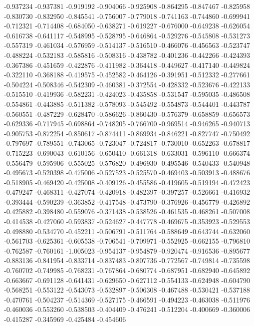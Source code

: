 -0.937234
-0.937381
-0.919192
-0.904066
-0.925908
-0.864295
-0.847467
-0.825958
-0.830730
-0.832950
-0.845541
-0.756007
-0.779018
-0.741163
-0.744860
-0.699941
-0.712321
-0.714408
-0.684050
-0.638271
-0.619227
-0.676000
-0.649238
-0.626054
-0.616738
-0.641117
-0.548995
-0.528795
-0.646864
-0.529276
-0.545808
-0.531273
-0.557319
-0.461034
-0.576959
-0.514137
-0.516510
-0.466076
-0.456563
-0.523747
-0.488224
-0.532183
-0.585816
-0.508316
-0.438782
-0.401236
-0.442266
-0.424393
-0.367386
-0.451659
-0.422876
-0.411982
-0.364418
-0.449627
-0.417140
-0.449824
-0.322110
-0.368188
-0.419575
-0.452582
-0.464126
-0.391951
-0.512332
-0.277661
-0.504224
-0.508346
-0.542309
-0.460381
-0.372554
-0.428332
-0.523676
-0.422133
-0.515510
-0.419936
-0.582231
-0.424023
-0.435858
-0.531547
-0.595035
-0.486508
-0.554861
-0.443885
-0.511382
-0.578093
-0.545492
-0.554873
-0.544401
-0.443787
-0.560551
-0.487229
-0.628470
-0.586626
-0.860430
-0.576379
-0.658859
-0.656573
-0.629336
-0.717945
-0.698864
-0.748205
-0.766700
-0.969514
-0.946265
-0.940713
-0.905753
-0.872254
-0.850617
-0.874411
-0.869934
-0.846221
-0.827747
-0.750492
-0.797697
-0.789551
-0.743065
-0.723047
-0.724817
-0.730010
-0.652263
-0.678817
-0.715223
-0.690043
-0.610156
-0.650410
-0.661318
-0.633031
-0.596110
-0.666374
-0.556479
-0.595906
-0.555025
-0.576820
-0.496930
-0.495546
-0.540433
-0.540948
-0.495673
-0.520398
-0.475006
-0.527523
-0.525570
-0.469403
-0.503913
-0.488676
-0.518905
-0.469420
-0.425008
-0.409126
-0.455586
-0.419605
-0.519194
-0.472423
-0.479247
-0.468311
-0.427074
-0.420918
-0.482397
-0.397257
-0.526661
-0.416932
-0.393444
-0.590239
-0.363852
-0.417548
-0.473790
-0.376926
-0.456779
-0.426892
-0.425882
-0.398480
-0.559076
-0.371438
-0.538526
-0.461535
-0.468261
-0.507008
-0.414538
-0.427060
-0.593837
-0.524627
-0.447778
-0.469675
-0.353923
-0.529553
-0.498880
-0.534770
-0.452211
-0.506791
-0.511764
-0.588649
-0.643744
-0.632060
-0.561703
-0.625361
-0.605538
-0.706541
-0.709971
-0.552925
-0.662155
-0.796810
-0.762587
-0.760161
-1.005023
-0.954137
-0.954879
-0.920474
-0.916536
-0.895677
-0.883136
-0.841954
-0.833714
-0.837483
-0.807736
-0.772567
-0.749814
-0.735598
-0.760702
-0.749985
-0.768231
-0.767864
-0.680774
-0.687951
-0.682940
-0.645892
-0.663667
-0.691128
-0.641431
-0.629650
-0.627112
-0.554133
-0.624948
-0.604790
-0.568251
-0.553122
-0.543073
-0.532897
-0.506308
-0.467488
-0.530421
-0.537188
-0.470761
-0.504237
-0.514369
-0.527175
-0.466591
-0.494223
-0.463038
-0.511976
-0.460036
-0.553260
-0.538503
-0.404409
-0.476241
-0.512204
-0.400669
-0.360006
-0.415287
-0.345969
-0.425484
-0.454606
